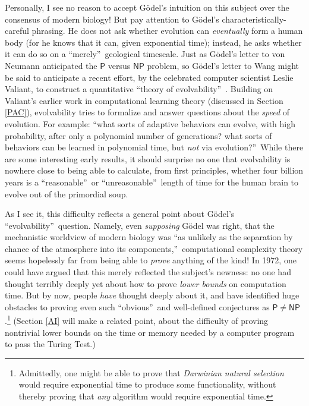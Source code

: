 \documentclass[12pt,onecolumn]{article}%
\begin{document}
Personally, I see no reason to accept G\"{o}del's intuition on this subject
over the consensus of modern biology! But pay attention to G\"{o}del's
characteristically-careful phrasing. He does not ask whether evolution can
\textit{eventually} form a human body (for he knows that it can, given
exponential time); instead, he asks whether it can do so on a
\textquotedblleft merely\textquotedblright\  geological\textit{ }timescale.
Just as G\"{o}del's letter to von Neumann anticipated the $\mathsf{P}$
versus $\mathsf{NP}$ problem, so G\"{o}del's letter to Wang might be said
to anticipate a recent effort, by the celebrated computer scientist Leslie
Valiant, to construct a quantitative \textquotedblleft theory of
evolvability\textquotedblright\  \cite{valiant:evol}. Building on Valiant's
earlier work in computational learning theory (discussed in Section
\ref{PAC}), evolvability tries to formalize and answer questions about the
\textit{speed} of evolution. For example: \textquotedblleft what sorts of
adaptive behaviors can evolve, with high probability, after only a polynomial
number of generations? what sorts of behaviors can be learned in polynomial
time, but \textit{not} via evolution?\textquotedblright\  While there are
some interesting early results, it should surprise no one that evolvability is
nowhere close to being able to calculate, from first principles, whether four
billion years is a \textquotedblleft reasonable\textquotedblright\  or
\textquotedblleft unreasonable\textquotedblright\  length of time for the human
brain to evolve out of the primordial soup.

As I see it, this difficulty reflects a general point about G\"{o}del's
\textquotedblleft evolvability\textquotedblright\  question. Namely, even
\textit{supposing} G\"{o}del was right, that the mechanistic worldview of
modern biology was \textquotedblleft as unlikely as the separation by chance
of the atmosphere into its components,\textquotedblright\  computational
complexity theory seems hopelessly far from being able to \textit{prove}
anything of the kind! In 1972, one could have argued that this merely
reflected the subject's newness: no one had thought terribly deeply yet about
how to prove \textit{lower bounds} on computation time. But by now, people
\textit{have} thought deeply about it, and have identified huge obstacles to
proving even such \textquotedblleft obvious\textquotedblright\  and
well-defined conjectures as $\mathsf{P}\neq\mathsf{NP}$.\footnote{Admittedly,
one might be able to prove that \textit{Darwinian natural selection} would
require exponential time to produce some functionality, without thereby
proving that \textit{any} algorithm would require exponential time.}
 (Section \ref{AI} will make a related point, about the difficulty of proving
nontrivial lower bounds on the time or memory needed by a computer program to
pass the Turing Test.)
\end{document}
